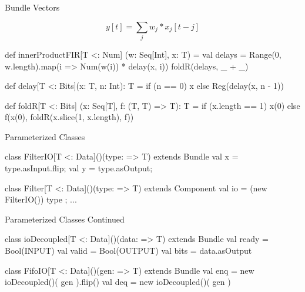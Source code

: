 \documentclass[xcolor=pdflatex,dvipsnames,table]{beamer}
\begin{document}
\begin{frame}[fragile]{Bundle Vectors}

\begin{equation}
y[t] = \sum_j w_j * x_j[t-j]
\end{equation}

\begin{scala}
def innerProductFIR[T <: Num] (w: Seq[Int], x: T) = {
  val delays = 
    Range(0, w.length).map(i => Num(w(i)) * delay(x, i))
  foldR(delays, _ + _)
}

def delay[T <: Bits](x: T, n: Int): T =
  if (n == 0) x else Reg(delay(x, n - 1))

def foldR[T <: Bits] (x: Seq[T], f: (T, T) => T): T =
  if (x.length == 1)
    x(0) 
  else 
    f(x(0), foldR(x.slice(1, x.length), f))
\end{scala}

\end{frame}

\begin{frame}[fragile]{Parameterized Classes}
\begin{scala}
class FilterIO[T <: Data]()(type: => T) extends Bundle { 
  val x = type.asInput.flip;
  val y = type.asOutput;
}

class Filter[T <: Data]()(type: => T) 
    extends Component { 
  val io = (new FilterIO()){ type };
  ...
}
\end{scala}
\end{frame}

\begin{frame}[fragile]{Parameterized Classes Continued}
\begin{scala}
class ioDecoupled[T <: Data]()(data: => T) 
    extends Bundle {
  val ready = Bool(INPUT)
  val valid = Bool(OUTPUT)
  val bits  = data.asOutput
}

class FifoIO[T <: Data]()(gen: => T) extends Bundle  {
  val enq = new ioDecoupled()( gen ).flip()
  val deq = new ioDecoupled()( gen )
}
\end{scala}
\end{frame}
\end{document}
